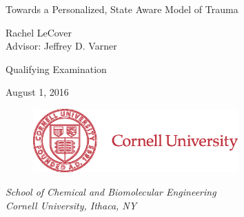 \documentclass[12pt]{article}
\makeatletter
\renewcommand\section{\@startsection
	{subsection}{2}{0mm}
	{-0.2in}
	{0.05\baselineskip}
	{\normalfont\large\bfseries}}
\makeatother
\begin{document}
\begin{titlepage}
  \begin{center}
    {\LARGE{Towards a Personalized, State Aware Model of Trauma}}\par
    \vspace{5em}
    { \Large{Rachel LeCover} \\
    \vspace{1em}
    { \large{Advisor: Jeffrey D. Varner}}\par
     \vspace{3em}
    { \large{Qualifying Examination}}\par
     \vspace{1em}
    { \large{August 1, 2016}}\par
    \begin{figure}[h]
    \vspace{3em}
       \centering
       \includegraphics[width=0.7\textwidth]{figures/CULogo187}
       \end{figure}
    \vspace{2em} \large{ \textit{School of Chemical and Biomolecular Engineering \\ \vspace{0.5em} Cornell University, Ithaca, NY}}}\par
    \vspace{3em}
  \end{center}
\end{titlepage}
\pagebreak
\setcounter{page}{1}
\end{document}
